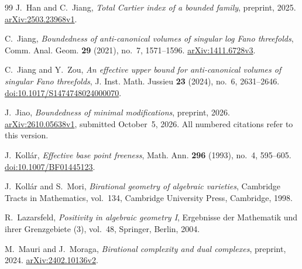 \documentclass[11pt,reqno]{amsart}
\numberwithin{equation}{section}
\theoremstyle{definition}
\theoremstyle{remark}
\begin{document}
\begin{thebibliography}{99}
J.~Han and C.~Jiang, \emph{Total Cartier index of a bounded family}, preprint, 2025.
\href{https://arxiv.org/abs/2503.23968v1}{arXiv:2503.23968v1}.

C.~Jiang, \emph{Boundedness of anti-canonical volumes of singular log Fano threefolds}, Comm. Anal. Geom. \textbf{29} (2021), no.~7, 1571--1596.
\href{https://arxiv.org/abs/1411.6728v3}{arXiv:1411.6728v3}.

C.~Jiang and Y.~Zou, \emph{An effective upper bound for anti-canonical volumes of singular Fano threefolds}, J. Inst. Math. Jussieu \textbf{23} (2024), no.~6, 2631--2646.
\href{https://doi.org/10.1017/S1474748024000070}{doi:10.1017/S1474748024000070}.

J.~Jiao, \emph{Boundedness of minimal modifications}, preprint, 2026.
\href{https://arxiv.org/abs/2610.05638v1}{arXiv:2610.05638v1}, submitted October~5, 2026. All numbered citations refer to this version.

J.~Koll\'ar, \emph{Effective base point freeness}, Math. Ann. \textbf{296} (1993), no.~4, 595--605.
\href{https://doi.org/10.1007/BF01445123}{doi:10.1007/BF01445123}.

J.~Koll\'ar and S.~Mori, \emph{Birational geometry of algebraic varieties}, Cambridge Tracts in Mathematics, vol.~134, Cambridge University Press, Cambridge, 1998.

R.~Lazarsfeld, \emph{Positivity in algebraic geometry I}, Ergebnisse der Mathematik und ihrer Grenzgebiete (3), vol.~48, Springer, Berlin, 2004.

M.~Mauri and J.~Moraga, \emph{Birational complexity and dual complexes}, preprint, 2024.
\href{https://arxiv.org/abs/2402.10136v2}{arXiv:2402.10136v2}.

\end{thebibliography}
\end{document}
